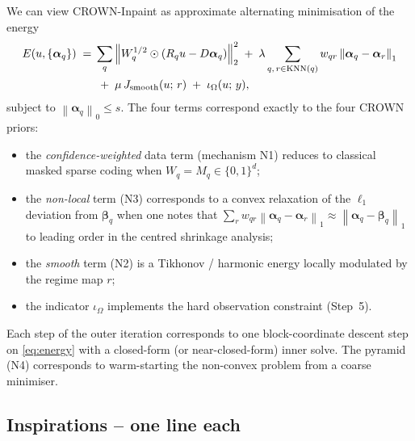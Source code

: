 \documentclass[11pt,a4paper]{article}
\theoremstyle{definition}
\theoremstyle{remark}
\newcommand{\norm}[1]{\left\lVert #1 \right\rVert}
\newcommand{\KNN}{\operatorname{KNN}}
\newcommand{\alphavec}{\bm{\alpha}}
\begin{document}
We can view CROWN-Inpaint as approximate alternating minimisation of
the energy
\begin{align}
E(u,\{\alphavec_q\})
\;=\;& \sum_q \norm{W_q^{1/2}\odot(R_q u - D\alphavec_q)}_2^2
       \;+\; \lambda \sum_{q,\,r\in\KNN(q)} w_{qr}\norm{\alphavec_q-\alphavec_r}_1
       \nonumber\\
     &\;+\; \mu\, J_{\rm smooth}(u;\,r)
       \;+\; \iota_\Omega(u;\,y),
\label{eq:energy}
\end{align}
subject to $\norm{\alphavec_q}_0\le s$. The four terms correspond
exactly to the four CROWN priors:
\begin{itemize}[itemsep=2pt]
\item the \emph{confidence-weighted} data term (mechanism N1) reduces to
classical masked sparse coding when $W_q=M_q\in\{0,1\}^d$;
\item the \emph{non-local} term (N3) corresponds to a convex relaxation
of the $\ell_1$ deviation from $\bm{\beta}_q$ when one notes that
$\sum_r w_{qr}\norm{\alphavec_q-\alphavec_r}_1 \approx
\norm{\alphavec_q-\bm{\beta}_q}_1$ to leading order in the centred
shrinkage analysis;
\item the \emph{smooth} term (N2) is a Tikhonov / harmonic energy
locally modulated by the regime map $r$;
\item the indicator $\iota_\Omega$ implements the hard observation
constraint (Step~5).
\end{itemize}
Each step of the outer iteration corresponds to one block-coordinate
descent step on \eqref{eq:energy} with a closed-form (or
near-closed-form) inner solve. The pyramid (N4) corresponds to
warm-starting the non-convex problem from a coarse minimiser.

\subsection{Inspirations -- one line each}
\end{document}
